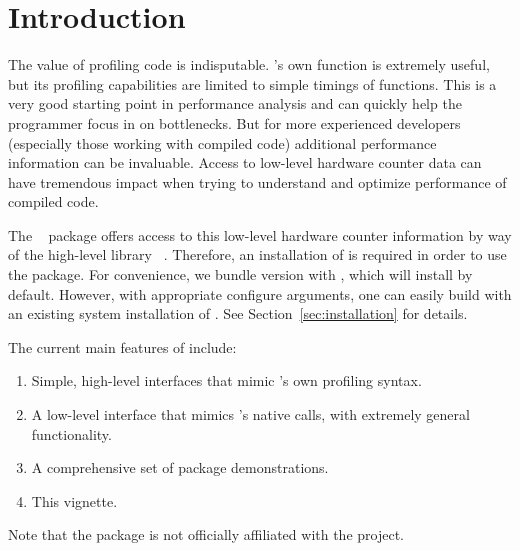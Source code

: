 \section{Introduction}
\label{sec:introduction}

The value of profiling code is indisputable.  \R's own  function 
is extremely useful, but its profiling capabilities are limited to simple 
timings of \R functions. This is a very good starting point in performance 
analysis and can quickly help the \R programmer focus in on bottlenecks.  But 
for more experienced developers (especially those working with compiled code) 
additional performance information can be invaluable. Access to low-level 
hardware counter data can have tremendous impact when trying to understand and 
optimize performance of compiled code. 

The \thispackage~\citep{Schmidt2014pbdPAPIpackage} package offers access to  
this low-level hardware counter information by way of the high-level \C library 
\PAPI~\citep{mucci1999papi}.  Therefore, an installation of \PAPI is required in 
order to use the package.  For convenience, we bundle \PAPI version \PAPIversion 
with \thispackage, which will install by default.  However, with appropriate 
configure arguments, one can easily build \thispackage with an existing system 
installation of \PAPI.  See Section~\ref{sec:installation} for details.

The current main features of \thispackage include:
\begin{enumerate}
  \item Simple, high-level interfaces that mimic \R's own profiling syntax.
  \item A low-level interface that mimics \PAPI's native calls, with extremely 
  general functionality.
  \item A comprehensive set of package demonstrations.
  \item This vignette.
\end{enumerate}

Note that the  package is not officially affiliated with the 
 project.